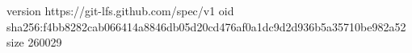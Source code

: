 version https://git-lfs.github.com/spec/v1
oid sha256:f4bb8282cab066414a8846db05d20cd476af0a1dc9d2d936b5a35710be982a52
size 260029
